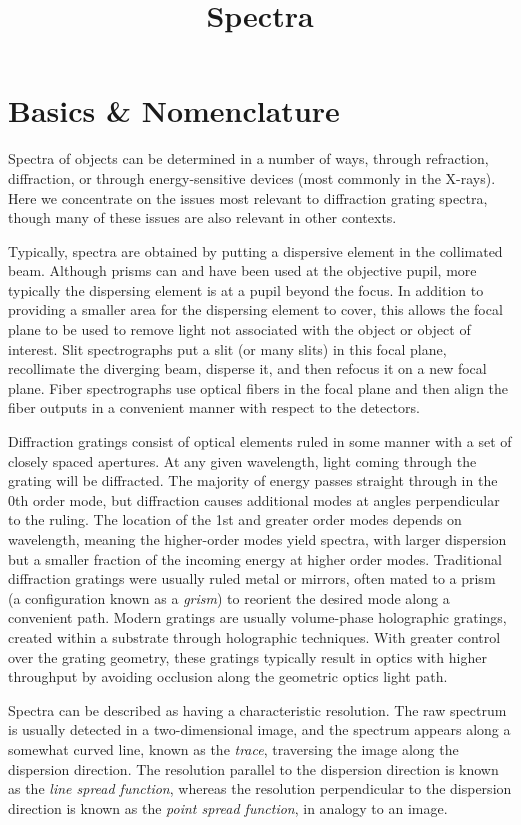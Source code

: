 \title{\bf Spectra}

\section{Basics \& Nomenclature}

Spectra of objects can be determined in a number of ways, through
refraction, diffraction, or through energy-sensitive devices (most
commonly in the X-rays). Here we concentrate on the issues most
relevant to diffraction grating spectra, though many of these issues
are also relevant in other contexts.

Typically, spectra are obtained by putting a dispersive element in the
collimated beam. Although prisms can and have been used at the
objective pupil, more typically the dispersing element is at a pupil
beyond the focus. In addition to providing a smaller area for the
dispersing element to cover, this allows the focal plane to be used to
remove light not associated with the object or object of
interest. Slit spectrographs put a slit (or many slits) in this focal
plane, recollimate the diverging beam, disperse it, and then refocus
it on a new focal plane. Fiber spectrographs use optical fibers in the
focal plane and then align the fiber outputs in a convenient manner
with respect to the detectors.

Diffraction gratings consist of optical elements ruled in some manner
with a set of closely spaced apertures. At any given wavelength, light
coming through the grating will be diffracted. The majority of energy
passes straight through in the 0th order mode, but diffraction causes
additional modes at angles perpendicular to the ruling. The location
of the 1st and greater order modes depends on wavelength, meaning the
higher-order modes yield spectra, with larger dispersion but a smaller
fraction of the incoming energy at higher order modes. Traditional
diffraction gratings were usually ruled metal or mirrors, often mated
to a prism (a configuration known as a {\it grism}) to reorient the
desired mode along a convenient path. Modern gratings are usually
volume-phase holographic gratings, created within a substrate through
holographic techniques. With greater control over the grating
geometry, these gratings typically result in optics with higher
throughput by avoiding occlusion along the geometric optics light
path.

Spectra can be described as having a characteristic resolution. The
raw spectrum is usually detected in a two-dimensional image, and the
spectrum appears along a somewhat curved line, known as the {\it
trace}, traversing the image along the dispersion direction. The
resolution parallel to the dispersion direction is known as the {\it
line spread function}, whereas the resolution perpendicular to the
dispersion direction is known as the {\it point spread function}, in
analogy to an image.

